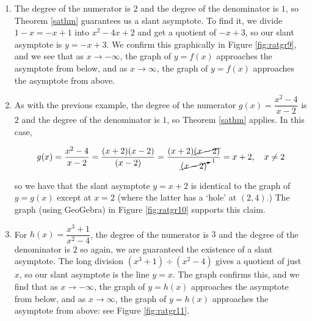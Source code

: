 {
\begin{enumerate}

\item  The degree of the numerator is $2$ and the degree of the denominator is $1$, so Theorem \ref{sathm} guarantees us a slant asymptote.  To find it, we divide $1-x = -x+1$ into $x^2-4x+2$ and get a quotient of $-x+3$, so our slant asymptote is $y=-x+3$.  We confirm this graphically in Figure \ref{fig:ratgr9}, and we see that as $x \rightarrow -\infty$, the graph of $y=f(x)$ approaches the asymptote from below, and as $x \rightarrow \infty$, the graph of $y=f(x)$ approaches the asymptote from above.



\item  As with the previous example, the degree of the numerator $g(x) = \dfrac{x^2-4}{x-2}$ is $2$ and the degree of the denominator is $1$, so Theorem \ref{sathm} applies.  In this case, 

\[ g(x) = \dfrac{x^2-4}{x-2} = \dfrac{(x+2)(x-2)}{(x-2)} = \dfrac{(x+2) \cancel{(x-2)}}{\cancelto{1}{(x-2)}} = x+2, \quad x \neq 2\]

so we have that the slant asymptote $y=x+2$ is identical to the graph of $y=g(x)$ except at $x=2$ (where the latter has a `hole' at $(2,4)$.)  The graph (using GeoGebra) in Figure \ref{fig:ratgr10} supports this claim.



\item   For $h(x) = \dfrac{x^3+1}{x^2-4}$, the degree of the numerator is $3$ and the degree of the denominator is $2$ so again, we are guaranteed the existence of a slant asymptote.  The long division $\left(x^3+1 \right) \div \left(x^2-4\right)$ gives a quotient of just $x$, so our slant asymptote is the line $y=x$.  The graph confirms this, and we find that as $x \rightarrow -\infty$, the graph of $y=h(x)$ approaches the asymptote from below, and as $x \rightarrow \infty$, the graph of $y=h(x)$ approaches the asymptote from above: see Figure \ref{fig:ratgr11}. 


\end{enumerate}}
